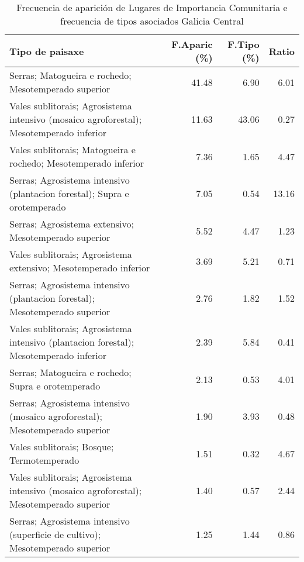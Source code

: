 \begin{table}[p]
\centering
\caption{Frecuencia de aparición de Lugares de Importancia Comunitaria e frecuencia de tipos asociados Galicia Central} 
\label{vnatura7}
\begin{tabular}{lrrr}
  \hline
Tipo de paisaxe & F.Aparic (\%) & F.Tipo (\%) & Ratio \\ 
  \hline
Serras; Matogueira e rochedo; Mesotemperado superior & 41.48 & 6.90 & 6.01 \\ 
  Vales sublitorais; Agrosistema intensivo (mosaico agroforestal); Mesotemperado inferior & 11.63 & 43.06 & 0.27 \\ 
  Vales sublitorais; Matogueira e rochedo; Mesotemperado inferior & 7.36 & 1.65 & 4.47 \\ 
  Serras; Agrosistema intensivo (plantacion forestal); Supra e orotemperado & 7.05 & 0.54 & 13.16 \\ 
  Serras; Agrosistema extensivo; Mesotemperado superior & 5.52 & 4.47 & 1.23 \\ 
  Vales sublitorais; Agrosistema extensivo; Mesotemperado inferior & 3.69 & 5.21 & 0.71 \\ 
  Serras; Agrosistema intensivo (plantacion forestal); Mesotemperado superior & 2.76 & 1.82 & 1.52 \\ 
  Vales sublitorais; Agrosistema intensivo (plantacion forestal); Mesotemperado inferior & 2.39 & 5.84 & 0.41 \\ 
  Serras; Matogueira e rochedo; Supra e orotemperado & 2.13 & 0.53 & 4.01 \\ 
  Serras; Agrosistema intensivo (mosaico agroforestal); Mesotemperado superior & 1.90 & 3.93 & 0.48 \\ 
  Vales sublitorais; Bosque; Termotemperado & 1.51 & 0.32 & 4.67 \\ 
  Vales sublitorais; Agrosistema intensivo (mosaico agroforestal); Mesotemperado superior & 1.40 & 0.57 & 2.44 \\ 
  Serras; Agrosistema intensivo (superficie de cultivo); Mesotemperado superior & 1.25 & 1.44 & 0.86 \\ 
   \hline
\end{tabular}
\end{table}
